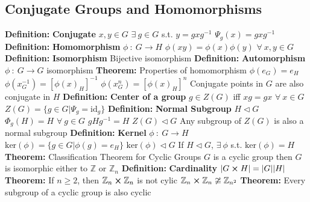 \documentclass[14pt]{extarticle}
\def\Definition{{\color{blue} \textbf{Definition:} }}
\def\Theorem{{\color{red} \textbf{Theorem:} }}
\begin{document}
\begin{outline}
	\subsection*{Conjugate Groups and Homomorphisms}
		\1	\Definition \textbf{Conjugate}
			\2	$x,y \in G$
			\2	$\exists~g \in G$ s.t. $y = gxg^{-1}$
			\2	$\Psi_g(x) = gxg^{-1}$
		\1	\Definition \textbf{Homomorphism}
			\2	$\phi~:~G \rightarrow H$
			\2	$\phi(xy) = \phi(x)\phi(y)$ $\forall~x,y \in G$
		\1	\Definition \textbf{Isomorphism}
			\2	Bijective isomorphism
		\1	\Definition \textbf{Automorphism}
			\2	$\phi~:~G \rightarrow G$ isomorphism
		\1	\Theorem Properties of homomorphism
			\2	$\phi(e_G) = e_H$
			\2	$\phi(x_G^{-1}) = [\phi(x)_H]^{-1}$
			\2	$\phi(x_G^n) = [\phi(x)_H]^n$
			\2	Conjugate points in $G$ are also conjugate in $H$
		\1	\Definition \textbf{Center of a group}
			\2	$g \in Z(G)$ iff $xg = gx$ $\forall~x \in G$
			\2	$Z(G) = \{g \in G | \Psi_g = \text{id}_g\}$
		\1	\Definition \textbf{Normal Subgroup}
			\2	$H \triangleleft G$
			\2	$\Phi_g(H) = H$ $\forall~g \in G$
				\3	$gHg^{-1} = H$
			\2	$Z(G) \triangleleft G$
				\3	Any subgroup of $Z(G)$ is also a normal subgroup
		\1	\Definition \textbf{Kernel}
			\2	$\phi~:~G \rightarrow H$
			\2	$\text{ker}(\phi) = \{g \in G | \phi(g) = e_H\}$
			\2	$\text{ker}(\phi) \triangleleft G$
			\2 If $H \triangleleft G$, $\exists~\phi$ s.t. $\text{ker}(\phi) = H$
		\1	\Theorem Classification Theorem for Cyclic Groups
			\2	$G$ is a cyclic group then $G$ is isomorphic either to $\mathbb{Z}$
					or $\mathbb{Z}_n$
		\1	\Definition \textbf{Cardinality}
			\2	$\abs{G \cross H} = \abs{G} \abs{H}$
		\1	\Theorem If $n \ge 2$, then $\mathbb{Z}_n \cross \mathbb{Z}_n$ is not cylic
			\2	$\mathbb{Z}_n \cross \mathbb{Z}_n \ncong \mathbb{Z}_{n^2}$
		\1	\Theorem Every subgroup of a cyclic group is also cyclic

	\end{outline}
\end{document}
